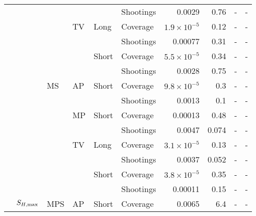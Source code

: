 \documentclass[article]{standalone}
\begin{document}
\begin{tabular}{llllllrrrr}
             &                   &    &    &       & Shootings &               0.0029 &      0.76 &                    - &                     - \\
             &                   &    & TV & Long & Coverage & $1.9 \times 10^{-5}$ &      0.12 &                    - &                     - \\
             &                   &    &    &       & Shootings &              0.00077 &      0.31 &                    - &                     - \\
             &                   &    &    & Short & Coverage & $5.5 \times 10^{-5}$ &      0.34 &                    - &                     - \\
             &                   &    &    &       & Shootings &               0.0028 &      0.75 &                    - &                     - \\
             &                   & MS & AP & Short & Coverage & $9.8 \times 10^{-5}$ &       0.3 &                    - &                     - \\
             &                   &    &    &       & Shootings &               0.0013 &       0.1 &                    - &                     - \\
             &                   &    & MP & Short & Coverage &              0.00013 &      0.48 &                    - &                     - \\
             &                   &    &    &       & Shootings &               0.0047 &     0.074 &                    - &                     - \\
             &                   &    & TV & Long & Coverage & $3.1 \times 10^{-5}$ &      0.13 &                    - &                     - \\
             &                   &    &    &       & Shootings &               0.0037 &     0.052 &                    - &                     - \\
             &                   &    &    & Short & Coverage & $3.8 \times 10^{-5}$ &      0.35 &                    - &                     - \\
             &                   &    &    &       & Shootings &              0.00011 &      0.15 &                    - &                     - \\
             & $S_{H, \rm{max}}$ & MPS & AP & Short & Coverage &               0.0065 &       6.4 &                    - &                     - \\

\end{tabular}
\end{document}

